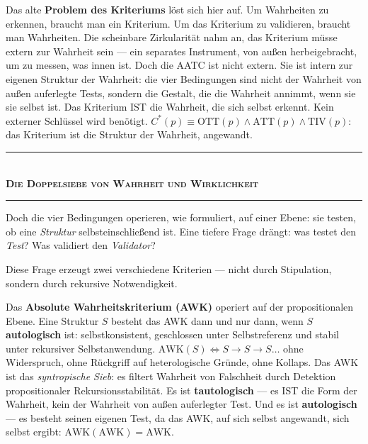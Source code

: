 \documentclass[10pt, openany, oneside]{book}
\renewcommand{\normalsize}{\fontsize{10}{13}\selectfont}
\begin{document}
Das alte \textbf{Problem des Kriteriums} löst sich hier auf. Um Wahrheiten zu erkennen, braucht man ein Kriterium. Um das Kriterium zu validieren, braucht man Wahrheiten. Die scheinbare Zirkularität nahm an, das Kriterium müsse extern zur Wahrheit sein --- ein separates Instrument, von außen herbeigebracht, um zu messen, was innen ist. Doch die AATC ist nicht extern. Sie ist intern zur eigenen Struktur der Wahrheit: die vier Bedingungen sind nicht der Wahrheit von außen auferlegte Tests, sondern die Gestalt, die die Wahrheit annimmt, wenn sie sie selbst ist. Das Kriterium IST die Wahrheit, die sich selbst erkennt. Kein externer Schlüssel wird benötigt. $C^*(p) \equiv \text{OTT}(p) \wedge \text{ATT}(p) \wedge \text{TIV}(p)$: das Kriterium ist die Struktur der Wahrheit, angewandt.

\vspace{1.5em}


\begin{center}
    \rule{0.3\textwidth}{0.4pt}\\[0.5em]
    {\normalsize\bfseries\scshape Die Doppelsiebe von Wahrheit und Wirklichkeit}\\[0.3em]
    \rule{0.3\textwidth}{0.4pt}
\end{center}

\vspace{1em}

\noindent Doch die vier Bedingungen operieren, wie formuliert, auf einer Ebene: sie testen, ob eine \textit{Struktur} selbsteinschließend ist. Eine tiefere Frage drängt: was testet den \textit{Test}? Was validiert den \textit{Validator}?

Diese Frage erzeugt zwei verschiedene Kriterien --- nicht durch Stipulation, sondern durch rekursive Notwendigkeit.

Das \textbf{Absolute Wahrheitskriterium (AWK)} operiert auf der propositionalen Ebene. Eine Struktur $S$ besteht das AWK dann und nur dann, wenn $S$ \textbf{autologisch} ist: selbstkonsistent, geschlossen unter Selbstreferenz und stabil unter rekursiver Selbstanwendung. $\text{AWK}(S) \iff S \to S \to S \ldots$ ohne Widerspruch, ohne Rückgriff auf heterologische Gründe, ohne Kollaps. Das AWK ist das \textit{syntropische Sieb}: es filtert Wahrheit von Falschheit durch Detektion propositionaler Rekursionsstabilität. Es ist \textbf{tautologisch} --- es IST die Form der Wahrheit, kein der Wahrheit von außen auferlegter Test. Und es ist \textbf{autologisch} --- es besteht seinen eigenen Test, da das AWK, auf sich selbst angewandt, sich selbst ergibt: $\text{AWK}(\text{AWK}) = \text{AWK}$.
\end{document}
